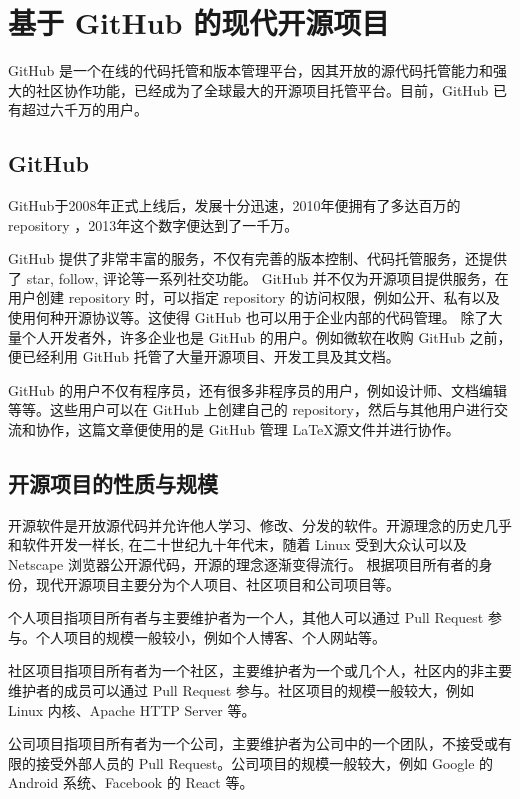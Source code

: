 \documentclass[../main.tex]{subfiles}
\begin{document}
\section{基于 GitHub 的现代开源项目}

GitHub 是一个在线的代码托管和版本管理平台，因其开放的源代码托管能力和强大的社区协作功能，已经成为了全球最大的开源项目托管平台。目前，GitHub 已有超过六千万的用户。

\subsection{GitHub}

GitHub于2008年正式上线后，发展十分迅速，2010年便拥有了多达百万的 repository \cite{github_million}，2013年这个数字便达到了一千万\cite{github_ten_million}。

GitHub 提供了非常丰富的服务，不仅有完善的版本控制、代码托管服务，还提供了 star, follow, 评论等一系列社交功能。
GitHub 并不仅为开源项目提供服务，在用户创建 repository 时，可以指定 repository 的访问权限，例如公开、私有以及使用何种开源协议等。这使得 GitHub 也可以用于企业内部的代码管理。
除了大量个人开发者外，许多企业也是 GitHub 的用户。例如微软在收购 GitHub 之前，便已经利用 GitHub 托管了大量开源项目、开发工具及其文档。

GitHub 的用户不仅有程序员，还有很多非程序员的用户，例如设计师、文档编辑等等。这些用户可以在 GitHub 上创建自己的 repository，然后与其他用户进行交流和协作，这篇文章便使用的是 GitHub 管理 \LaTeX 源文件并进行协作。

\subsection{开源项目的性质与规模}

开源软件是开放源代码并允许他人学习、修改、分发的软件。开源理念的历史几乎和软件开发一样长,
在二十世纪九十年代末，随着 Linux 受到大众认可以及 Netscape 浏览器公开源代码，开源的理念逐渐变得流行\cite{opensource}。
根据项目所有者的身份，现代开源项目主要分为个人项目、社区项目和公司项目等。

个人项目指项目所有者与主要维护者为一个人，其他人可以通过 Pull Request 参与。个人项目的规模一般较小，例如个人博客、个人网站等。

社区项目指项目所有者为一个社区，主要维护者为一个或几个人，社区内的非主要维护者的成员可以通过 Pull Request 参与。社区项目的规模一般较大，例如 Linux 内核、Apache HTTP Server 等。

公司项目指项目所有者为一个公司，主要维护者为公司中的一个团队，不接受或有限的接受外部人员的 Pull Request。公司项目的规模一般较大，例如 Google 的 Android 系统、Facebook 的 React 等。
\end{document}
